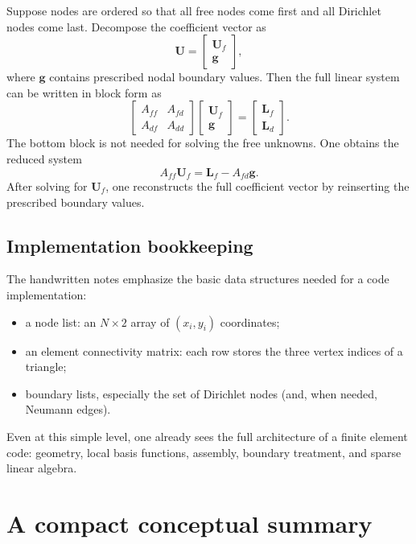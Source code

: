 \documentclass[11pt]{article}
\theoremstyle{definition}
\begin{document}
Suppose nodes are ordered so that all free nodes come first and all Dirichlet nodes come last. Decompose the coefficient vector as
\[
\mathbf{U}=
\begin{bmatrix}
\mathbf{U}_f\\
\mathbf{g}
\end{bmatrix},
\]
where $\mathbf{g}$ contains prescribed nodal boundary values. Then the full linear system can be written in block form as
\[
\begin{bmatrix}
A_{ff} & A_{fd}\\
A_{df} & A_{dd}
\end{bmatrix}
\begin{bmatrix}
\mathbf{U}_f\\
\mathbf{g}
\end{bmatrix}
=
\begin{bmatrix}
\mathbf{L}_f\\
\mathbf{L}_d
\end{bmatrix}.
\]
The bottom block is not needed for solving the free unknowns. One obtains the reduced system
\[
A_{ff}\mathbf{U}_f = \mathbf{L}_f - A_{fd}\mathbf{g}.
\]
After solving for $\mathbf{U}_f$, one reconstructs the full coefficient vector by reinserting the prescribed boundary values.

\subsection{Implementation bookkeeping}

The handwritten notes emphasize the basic data structures needed for a code implementation:
\begin{itemize}
    \item a node list: an $N\times 2$ array of $(x_i,y_i)$ coordinates;
    \item an element connectivity matrix: each row stores the three vertex indices of a triangle;
    \item boundary lists, especially the set of Dirichlet nodes (and, when needed, Neumann edges).
\end{itemize}

Even at this simple level, one already sees the full architecture of a finite element code: geometry, local basis functions, assembly, boundary treatment, and sparse linear algebra.

\section{A compact conceptual summary}
\end{document}
